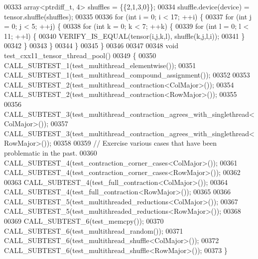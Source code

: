 \begin{DoxyCode}
00333   array<ptrdiff\_t, 4> shuffles = \{\{2,1,3,0\}\};
00334   shuffle.device(device) = tensor.shuffle(shuffles);
00335 
00336   \textcolor{keywordflow}{for} (\textcolor{keywordtype}{int} i = 0; i < 17; ++i) \{
00337     \textcolor{keywordflow}{for} (\textcolor{keywordtype}{int} j = 0; j < 5; ++j) \{
00338       \textcolor{keywordflow}{for} (\textcolor{keywordtype}{int} k = 0; k < 7; ++k) \{
00339         \textcolor{keywordflow}{for} (\textcolor{keywordtype}{int} l = 0; l < 11; ++l) \{
00340           VERIFY\_IS\_EQUAL(tensor(i,j,k,l), shuffle(k,j,l,i));
00341         \}
00342       \}
00343     \}
00344   \}
00345 \}
00346 
00347 
00348 \textcolor{keywordtype}{void} test\_cxx11\_tensor\_thread\_pool()
00349 \{
00350   CALL\_SUBTEST\_1(test\_multithread\_elementwise());
00351   CALL\_SUBTEST\_1(test\_multithread\_compound\_assignment());
00352 
00353   CALL\_SUBTEST\_2(test\_multithread\_contraction<ColMajor>());
00354   CALL\_SUBTEST\_2(test\_multithread\_contraction<RowMajor>());
00355 
00356   CALL\_SUBTEST\_3(test\_multithread\_contraction\_agrees\_with\_singlethread<ColMajor>());
00357   CALL\_SUBTEST\_3(test\_multithread\_contraction\_agrees\_with\_singlethread<RowMajor>());
00358 
00359   \textcolor{comment}{// Exercise various cases that have been problematic in the past.}
00360   CALL\_SUBTEST\_4(test\_contraction\_corner\_cases<ColMajor>());
00361   CALL\_SUBTEST\_4(test\_contraction\_corner\_cases<RowMajor>());
00362 
00363   CALL\_SUBTEST\_4(test\_full\_contraction<ColMajor>());
00364   CALL\_SUBTEST\_4(test\_full\_contraction<RowMajor>());
00365 
00366   CALL\_SUBTEST\_5(test\_multithreaded\_reductions<ColMajor>());
00367   CALL\_SUBTEST\_5(test\_multithreaded\_reductions<RowMajor>());
00368 
00369   CALL\_SUBTEST\_6(test\_memcpy());
00370   CALL\_SUBTEST\_6(test\_multithread\_random());
00371   CALL\_SUBTEST\_6(test\_multithread\_shuffle<ColMajor>());
00372   CALL\_SUBTEST\_6(test\_multithread\_shuffle<RowMajor>());
00373 \}
\end{DoxyCode}
